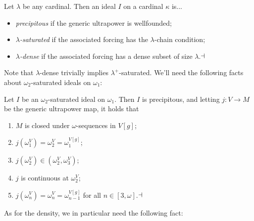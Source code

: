 \documentclass[../main]{subfiles}
\begin{document}
\begin{definition}
  Let $\lambda$ be any cardinal. Then an ideal $I$ on a cardinal
  $\kappa$ is...
  \begin{itemize}
  \item {} \emph{precipitous} if the generic
    ultrapower is wellfounded;
  \item {} \emph{$\lambda$-saturated}
    if the associated forcing has the $\lambda$-chain condition;
  \item {} \emph{$\lambda$-dense} if the
    associated forcing has a dense subset of size
    $\lambda$.$\hfill\dashv$
  \end{itemize}
\end{definition}

Note that $\lambda$-dense trivially implies
$\lambda^+$-saturated. We'll need the following facts about
$\omega_2$-saturated ideals on $\omega_1$:

\begin{proposition}
  \label{prop.ideal}
  Let $I$ be an $\omega_2$-saturated ideal on $\omega_1$. Then $I$ is
  precipitous, and letting $j \colon V\to M$ be the generic ultrapower map,
  it holds that
  \begin{enumerate}
    \item $M$ is closed under $\omega$-sequences in $V[g]$;
    \item $j(\omega_1^V)=\omega_2^V=\omega_1^{V[g]}$;
    \item $j(\omega_2^V)\in(\omega_2^V,\omega_3^V)$;
    \item $j$ is continuous at $\omega_2^V$;
    \item $j(\omega_n^V)=\omega_n^V=\omega_{n-1}^{V[g]}$ for all
      $n\in[3,\omega]$.$\hfill\dashv$
  \end{enumerate}
\end{proposition}

As for the density, we in particular need the following fact:


\end{document}
